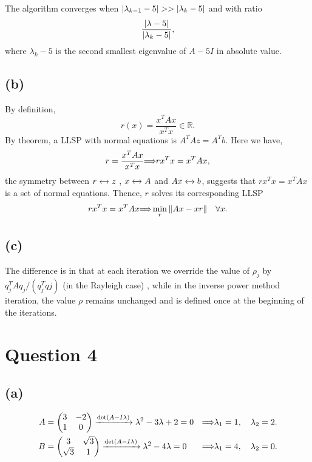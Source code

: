 \documentclass[12pt]{article}
\let\oldimplies\implies
\renewcommand*{\implies}{
	\hspace{-0.05cm}\resizebox{.95\width}{\height}{$\oldimplies$}\hspace{-0.05cm}
}
\begin{document}
		\noindent The algorithm converges when $\abs{\lambda_{k-1} -5} >> \abs{\lambda_{k} - 5}$
		and with ratio 
		$$ \frac{\abs{\lambda - 5}}{\abs{\lambda_k - 5}},$$
		where $\lambda_k -5$ is the second smallest eigenvalue of $A - 5I$ in absolute value.
		
		\subsection*{(b)}
			By definition, 
			$$ r(x) = \frac{x^{T}Ax}{x^{T}x} \in \mathbb{R}.$$
			By theorem, a LLSP with normal equations is $A^{T}Az = A^{T}b$. Here we have, 
			$$ r = \frac{x^{T}Ax}{x^{T}x} \implies  rx^{T} x = x^{T}Ax,$$
			the symmetry between $r \xleftrightarrow[]{} z$ , $x \xleftrightarrow[]{} A$ and $Ax \xleftrightarrow[]{} b$, suggests that $rx^{T}x = x^{T}Ax$ is a set of normal equations. Thence, $r$ solves its corresponding LLSP
			$$ rx^{T}x = x^{T}Ax \implies \min\limits_r \norm{Ax - xr} \quad \forall x.$$
		\subsection*{(c)}
			The difference is in that at each iteration we override the value of $\rho_j$ by $q^{T}_{j} A q_{j} / (q_{j}^{T} q{j})$ (in the Rayleigh case) , while in the inverse power method iteration, the value $\rho$ remains unchanged and is defined once at the beginning of the iterations. 
		
	\section*{Question 4}
		\subsection*{(a)}
			\begin{align*}
			 A &= \begin{pmatrix}
				3& -2 \\ 1 & 0 
			\end{pmatrix}
			\xrightarrow{\det(A - I\lambda)} \lambda^{2} -3 \lambda +2 = 0 &\implies \lambda_1 = 1 , \quad \lambda_2 = 2. \\
			B &= \begin{pmatrix}
				3 & \sqrt{3} \\ \sqrt{3} & 1
			\end{pmatrix}
			\xrightarrow{\det(A - I \lambda)} \lambda^{2} - 4\lambda =0 &\implies \lambda_1 = 4 , \quad \lambda_2 =0.
			\end{align*}
\end{document}
